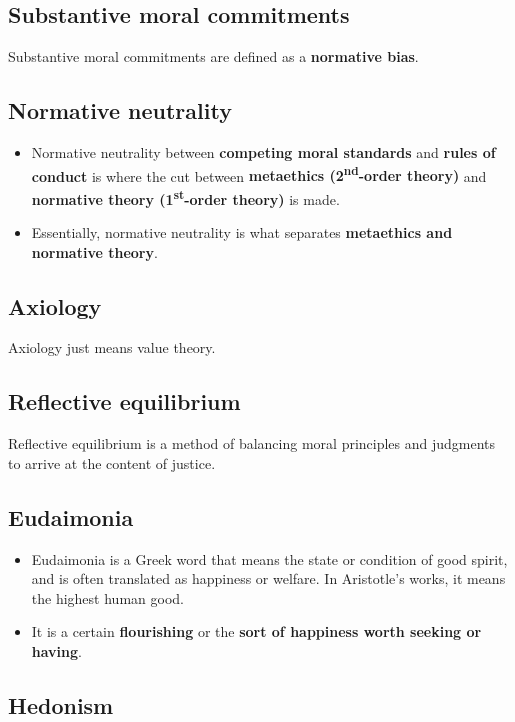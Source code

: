 \documentclass[11pt]{article}
\begin{document}
\subsection{Substantive moral commitments}
\label{sec:org787cb39}
Substantive moral commitments are defined as a \textbf{normative bias}.
\subsection{Normative neutrality}
\label{sec:orge5cf89e}
\begin{itemize}
\item Normative neutrality between \textbf{competing moral standards} and \textbf{rules of conduct} is where the cut between \textbf{metaethics (2\textsuperscript{nd}-order theory)} and \textbf{normative theory (1\textsuperscript{st}-order theory)} is made.
\item Essentially, normative neutrality is what separates \textbf{metaethics and normative theory}.
\end{itemize}
\subsection{Axiology}
\label{sec:org0495520}
Axiology just means value theory.
\subsection{Reflective equilibrium}
\label{sec:org6717dea}
Reflective equilibrium is a method of balancing moral principles and judgments to arrive at the content of justice.

 \newpage
\subsection{Eudaimonia}
\label{sec:org8e08b10}
\begin{itemize}
\item Eudaimonia is a Greek word that means the state or condition of good spirit, and is often translated as happiness or welfare. In Aristotle's works, it means the highest human good.
\item It is a certain \textbf{flourishing} or the \textbf{sort of happiness worth seeking or having}.
\end{itemize}
\subsection{Hedonism}
\label{sec:org903e6b0}
\end{document}
